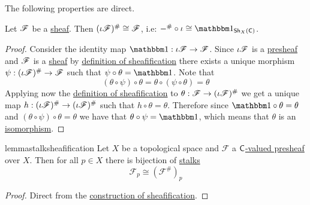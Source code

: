 \documentclass[../../main]{subfiles}
\begin{document}
The following properties are direct.

\begin{lemma}\label{lemma:sheafification-of-sheaf-is-sheaf}
  Let \(\mathscr{F}\) be a \hyperref[def:sheaf]{sheaf}.
  Then \((\iota\mathscr{F})^{\#} \cong \mathscr{F}\), i.e: \(-^{\#} \circ \iota \cong \id_{\Sh_{X}(\category{C})}\).
\end{lemma}
\begin{proof}
  Consider the identity map \(\id: \iota\sheaf{F} \to \sheaf{F}\).
  Since \(\iota\mathscr{F}\) is a \hyperref[def:presheaf]{presheaf} and \(\mathscr{F}\) is a \hyperref[def:sheaf]{sheaf} by \hyperref[def:sheafification]{definition of sheafification} there exists a unique morphism \(\psi: (\iota\mathscr{F})^{\#} \to \mathscr{F}\) such that \(\psi \circ \theta = \id\).
  Note that
  \begin{equation*}
    (\theta \circ \psi) \circ \theta = \theta \circ (\psi \circ \theta) = \theta
  \end{equation*}
  Applying now the \hyperref[def:sheafification]{definition of sheafification} to \(\theta: \mathscr{F} \to (\iota\mathscr{F})^{\#}\) we get a unique map \(h: (\iota\mathscr{F})^{\#} \to (\iota\mathscr{F})^{\#}\) such that \(h \circ \theta = \theta\).
  Therefore since \(\id \circ \theta = \theta\) and \((\theta \circ \psi) \circ \theta = \theta\) we have that \(\theta \circ \psi = \id\), which means that \(\theta\) is an \hyperref[def:categorical-isomorphism]{isomorphism}.
\end{proof}


\begin{restatable}{lemma}{stalksheafification}\label{lemma:stalk-commute-sheafification}
  Let \(X\) be a topological space and \(\mathcal{F}\) a \hyperref[def:presheaf]{\(\mathsf{C}\)-valued presheaf} over \(X\).
  Then for all \(p \in X\) there is bijection of \hyperref[def:stalk]{stalks}
  \begin{equation*}
    \mathcal{F}_{p} \cong (\mathcal{F}^{\#})_{p}
  \end{equation*}
\end{restatable}
\begin{proof}
  Direct from the \hyperref[const:sheafification-godement]{construction of sheafification}.
\end{proof}

\end{document}
